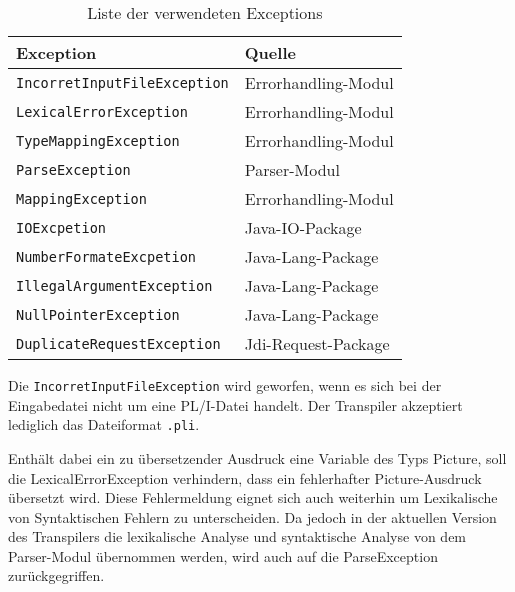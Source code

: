 \begin{table}[h]
	\centering
	
	\begin{tabularx}{\textwidth}{|X|X|}
		\hline
		\textbf{Exception} & \textbf{Quelle}  \\
		\hline
		\verb+IncorretInputFileException+ & Errorhandling-Modul  \\
		
		\verb+LexicalErrorException+ & Errorhandling-Modul  \\
		
		\verb+TypeMappingException+ & Errorhandling-Modul \\
		
		\verb+ParseException+ & Parser-Modul \\
		
		\verb+MappingException+ & Errorhandling-Modul \\
		
		\verb+IOExcpetion+ & Java-IO-Package \\
		
		\verb+NumberFormateExcpetion+ & Java-Lang-Package \\
		
		\verb+IllegalArgumentException+ & Java-Lang-Package \\
		
		\verb+NullPointerException+ & Java-Lang-Package \\
		
		\verb+DuplicateRequestException+ & Jdi-Request-Package \\
		\hline
		
	\end{tabularx}
	
	\caption{Liste der verwendeten Exceptions \label{tab:exceptiontabel}}
\end{table}
Die \verb+IncorretInputFileException+ wird geworfen, wenn
es sich bei der Eingabedatei nicht um eine PL/I-Datei handelt.
Der Transpiler akzeptiert lediglich das Dateiformat \verb+.pli+.

Enthält dabei ein zu übersetzender Ausdruck eine Variable des Typs Picture, soll die LexicalErrorException verhindern, dass ein fehlerhafter Picture-Ausdruck übersetzt wird.
Diese Fehlermeldung eignet sich auch weiterhin um Lexikalische von Syntaktischen Fehlern zu unterscheiden. Da jedoch in der aktuellen Version des Transpilers die lexikalische Analyse und syntaktische Analyse von dem Parser-Modul übernommen werden, wird auch auf die ParseException zurückgegriffen.

